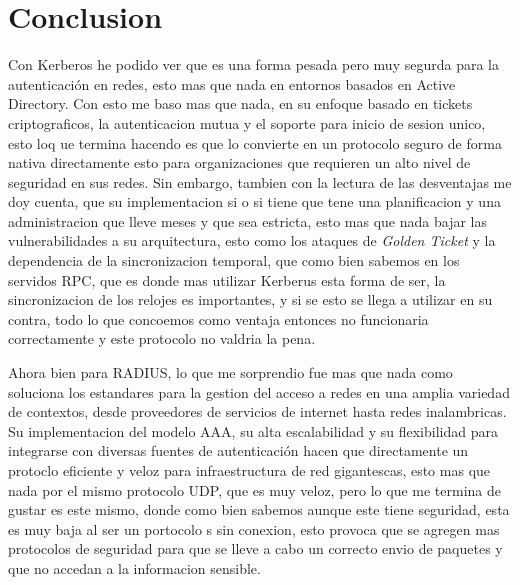 \documentclass[letterpaper,12pt]{article}
\begin{document}
\section{Conclusion}

Con Kerberos he podido ver que es una forma pesada pero muy segurda para la autenticaci\'on en redes, 
esto mas que nada en entornos basados en Active Directory. 
Con esto me baso mas que nada, en su enfoque basado en tickets criptograficos, 
la autenticacion mutua y el soporte para inicio de sesion unico, esto loq ue termina hacendo es que lo 
convierte en un protocolo seguro de forma nativa directamente esto para organizaciones que requieren un alto nivel
de seguridad en sus redes. Sin embargo, tambien con la lectura de las desventajas me doy cuenta, que 
su implementacion si o si tiene que tene una planificacion y una administracion 
que lleve meses y que sea estricta, esto mas que nada bajar las vulnerabilidades a su arquitectura, 
esto como los ataques de \textit{Golden Ticket} y la dependencia de la sincronizacion temporal, que como bien sabemos en los servidos RPC, que es donde 
mas utilizar Kerberus esta forma de ser, la sincronizacion de los relojes es importantes, y si se esto se llega a utilizar en su contra, todo lo que concoemos 
como ventaja entonces no funcionaria correctamente y este protocolo no valdria la pena.

Ahora bien para RADIUS, lo que me sorprendio fue mas que nada como soluciona los estandares
para la gestion del acceso a redes en una amplia variedad de contextos, 
desde proveedores de servicios de internet hasta redes inalambricas. 
Su implementacion del modelo AAA, su alta escalabilidad y su flexibilidad 
para integrarse con diversas fuentes de autenticaci\'on hacen que directamente
un protoclo eficiente y veloz para infraestructura de red gigantescas, esto mas que nada por el mismo protocolo UDP, que es 
muy veloz, pero lo que me termina de gustar es este mismo, donde como bien sabemos aunque este tiene seguridad, esta es muy baja al ser un portocolo s
sin conexion, esto provoca que se agregen mas protocolos de seguridad para que se lleve a cabo un correcto envio de paquetes y que no accedan a la informacion
sensible.


\newpage
    \nocite{*} 
    \printbibliography[heading=bibintoc, title={Referencias}]
\end{document}
